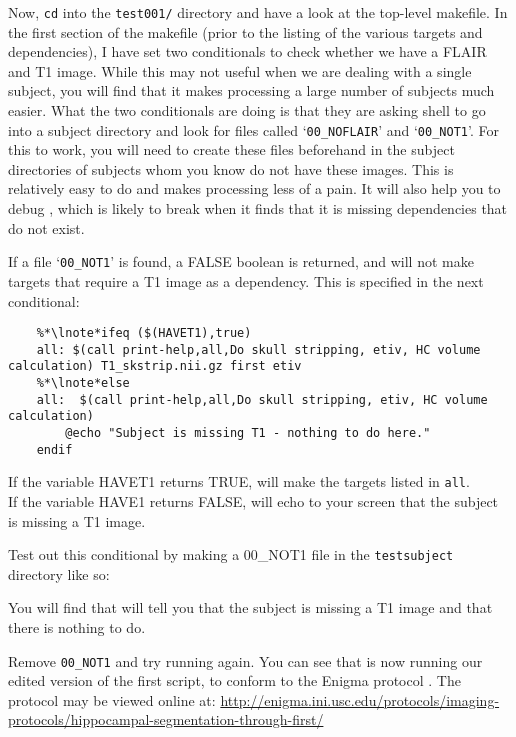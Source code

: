 Now, \texttt{cd} into the \texttt{test001/} directory and have a look at the top-level makefile. In the first section of the makefile (prior to the listing of the various targets and dependencies), I have set two conditionals to check whether we have a FLAIR and T1 image. While this may not useful when we are dealing with a single subject, you will find that it makes processing a large number of subjects much easier. What the two conditionals are doing is that they are asking shell to go into a subject directory and look for files called `\texttt{00_NOFLAIR}' and `\texttt{00_NOT1}'. For this to work, you will need to create these files beforehand in the subject directories of subjects whom you know do not have these images. This is relatively easy to do and makes processing less of a pain. It will also help you to debug \maken{}, which is likely to break when it finds that it is missing dependencies that do not exist.  

	
If a file `\texttt{00_NOT1}' is found, a FALSE boolean is returned, and \maken{} will not make targets that require a T1 image as a dependency. This is specified in the next conditional:
\begin{lstlisting}
	%*\lnote*ifeq ($(HAVET1),true)
	all: $(call print-help,all,Do skull stripping, etiv, HC volume calculation) T1_skstrip.nii.gz first etiv
	%*\lnote*else
	all:  $(call print-help,all,Do skull stripping, etiv, HC volume calculation)
		@echo "Subject is missing T1 - nothing to do here."
	endif
\end{lstlisting}

If the variable HAVET1 returns TRUE, \maken{} will make the targets listed in \texttt{all}.\\
\indent{}If the variable HAVE1 returns FALSE, \maken{} will echo to your screen that the subject is missing a T1 image.

Test out this conditional by making a 00_NOT1 file in the \texttt{testsubject} directory like so:

You will find that \maken{} will tell you that the subject is missing a T1 image and that there is nothing to do.

Remove \texttt{00_NOT1} and try running \maken{} again. You can see that \maken{} is now running our edited version of the first script, to conform to the Enigma protocol \citep[see][]{Stein2012}. 
The protocol may be viewed online at: \url{http://enigma.ini.usc.edu/protocols/imaging-protocols/hippocampal-segmentation-through-first/}

